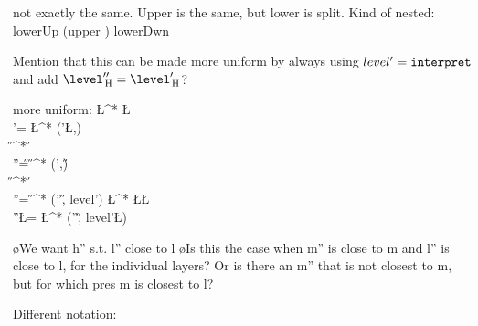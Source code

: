 

not exactly the same. Upper is the same, but lower is split. Kind of nested: lowerUp (upper ) lowerDwn

Mention that this can be made more uniform by always using $level' = {\tt interpret}$ and add $\level''\H = \level'\H$?

\bc more uniform:
\interpret\L^* \tp \Level\L \times \Level\M \rightarrow \Level\M\\
\level'\M = \interpret\L^* (\level'\L,\level\M)\\ 
\interpret\H^* \tp \Level\M \times \Level\H \rightarrow \Level\H\\
\level''\H = \interpret\H^* (\level'\M,\level\H)\\ 
\present\H^* \tp \Level\H \times \Level\M \rightarrow \Level\M\\
\level''\M = \present\H^* (\level''\H, level'\M)
\present\L^* \tp \Level\M \times \Level\L \rightarrow \Level\L\\
\level''\L = \present\L^* (\level''\H, level'\L)
\ec

\bl
\o We want h'' s.t. l'' close to l
\o Is this the case when m'' is close to m and l'' is close to l, for the individual layers? Or is there an m'' that is not closest to m, but for which pres m is closest to l?
\el





Different notation:



